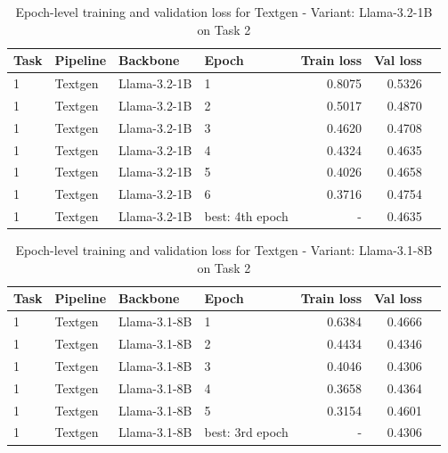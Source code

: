 \begin{table}[t]
    \centering
    \caption{Epoch-level training and validation loss for Textgen - Variant: Llama-3.2-1B on Task 2}
    \label{tab:epoch-summary-llama3.2-1b-textgen-task2}
    \begin{tabular}{llllrrr}
        \toprule
        Task & Pipeline & Backbone & Epoch & Train loss & Val loss \\
        \midrule
        1 & Textgen & Llama-3.2-1B   & 1   & 0.8075 & 0.5326 \\
        1 & Textgen & Llama-3.2-1B   & 2 & 0.5017 & 0.4870 \\
        1 & Textgen & Llama-3.2-1B   & 3 & 0.4620 & 0.4708 \\
        1 & Textgen & Llama-3.2-1B   & 4 & 0.4324 & 0.4635 \\
        1 & Textgen & Llama-3.2-1B   & 5 & 0.4026 & 0.4658 \\
        1 & Textgen & Llama-3.2-1B   & 6 & 0.3716 & 0.4754 \\
        \midrule
        1 & Textgen & Llama-3.2-1B   & best: 4th epoch & - & 0.4635 \\
        \bottomrule
    \end{tabular}
\end{table}

\begin{table}[t]
    \centering
    \caption{Epoch-level training and validation loss for Textgen - Variant: Llama-3.1-8B on Task 2}
    \label{tab:epoch-summary-llama3.1-8b-textgen-task2}
    \begin{tabular}{llllrrr}
        \toprule
        Task & Pipeline & Backbone & Epoch & Train loss & Val loss \\
        \midrule
        1 & Textgen & Llama-3.1-8B   & 1 & 0.6384 & 0.4666 \\
        1 & Textgen & Llama-3.1-8B   & 2 & 0.4434 & 0.4346 \\
        1 & Textgen & Llama-3.1-8B   & 3 & 0.4046 & 0.4306 \\
        1 & Textgen & Llama-3.1-8B   & 4 & 0.3658 & 0.4364 \\
        1 & Textgen & Llama-3.1-8B   & 5 & 0.3154 & 0.4601 \\
        \midrule
        1 & Textgen & Llama-3.1-8B   & best: 3rd epoch & - & 0.4306 \\
        \bottomrule
    \end{tabular}
\end{table}

